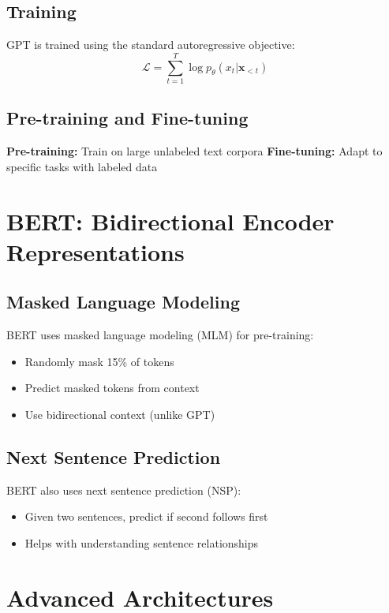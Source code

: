 \subsection{Training}

GPT is trained using the standard autoregressive objective:
\begin{equation}
    \mathcal{L} = \sum_{t=1}^T \log p_\theta(x_t | \mathbf{x}_{<t})
\end{equation}

\subsection{Pre-training and Fine-tuning}

\textbf{Pre-training:} Train on large unlabeled text corpora
\textbf{Fine-tuning:} Adapt to specific tasks with labeled data

\section{BERT: Bidirectional Encoder Representations}

\subsection{Masked Language Modeling}

BERT uses masked language modeling (MLM) for pre-training:
\begin{itemize}
    \item Randomly mask 15\% of tokens
    \item Predict masked tokens from context
    \item Use bidirectional context (unlike GPT)
\end{itemize}

\subsection{Next Sentence Prediction}

BERT also uses next sentence prediction (NSP):
\begin{itemize}
    \item Given two sentences, predict if second follows first
    \item Helps with understanding sentence relationships
\end{itemize}

\section{Advanced Architectures}

